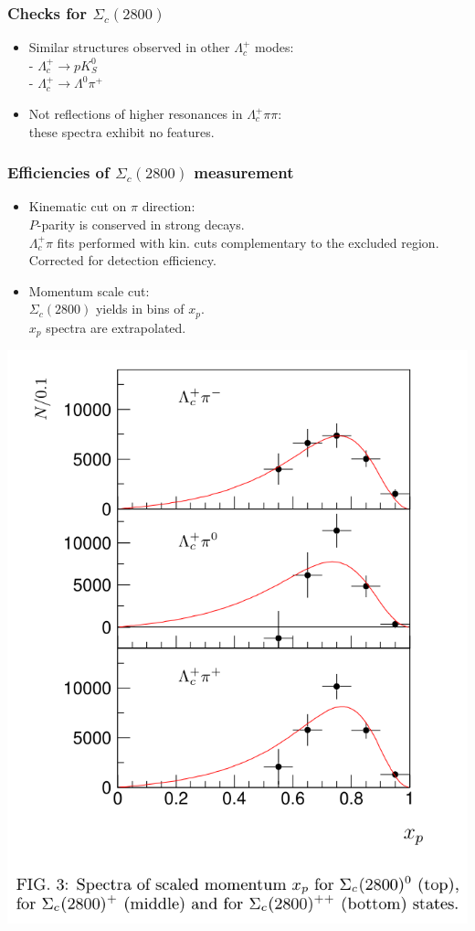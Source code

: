 \documentclass[10pt, aspectratio=169]{beamer}
\def\Lc{{\Lambda_c^+}}
\def\ScIII{{\Sigma_c(2800)}}
\def\pip{{\pi^+}}
\begin{document}
\begin{frame}[label=checks-sc2800]%
  \frametitle{Checks for $\ScIII$}
  \large
  \begin{itemize}
    \item Similar structures observed in other $\Lc$ modes:
      \\- $\Lc\to p K_S^0$
      \\- $\Lc\to\Lambda^0\pip$
    \item Not reflections of higher resonances in $\Lc\pi\pi$:
      \\ these spectra exhibit no features.
  \end{itemize}
\end{frame}%

\begin{frame}[label=efficiency-sc2800]%
  \frametitle{Efficiencies of $\ScIII$ measurement}
  \centering
  \parbox{.48\linewidth}{
    \begin{itemize}
      \item Kinematic cut on $\pi$ direction:
        \\ $P$-parity is conserved in strong decays.
        \\ $\Lc\pi$ fits performed with kin. cuts
        complementary to the excluded region.
        \\ Corrected for detection efficiency.
      \item Momentum scale cut:
        \\ $\ScIII$ yields in bins of $x_p$.
        \\ $x_p$ spectra are extrapolated.
    \end{itemize}
  } \parbox{.48\linewidth}{
    \centering
    \includegraphics[height=.85\textheight]{figures/005/fig1-003}
  }
\end{frame}%
\end{document}
